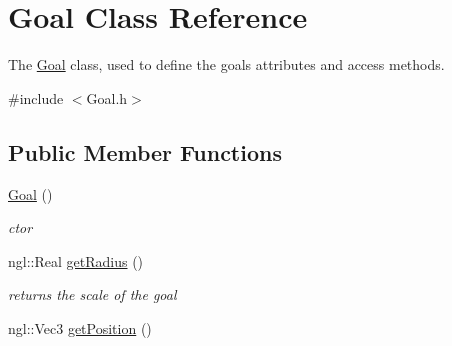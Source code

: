 \hypertarget{class_goal}{}\section{Goal Class Reference}
\label{class_goal}


The \hyperlink{class_goal}{Goal} class, used to define the goal\textquotesingle{}s attributes and access methods.  




{\ttfamily \#include $<$Goal.\+h$>$}

\subsection*{Public Member Functions}
\begin{DoxyCompactItemize}
\item 
\hypertarget{class_goal_aef5013c9bf548e51178f58da869d508a}{}\hyperlink{class_goal_aef5013c9bf548e51178f58da869d508a}{Goal} ()\label{class_goal_aef5013c9bf548e51178f58da869d508a}

\begin{DoxyCompactList}\small\item\em ctor \end{DoxyCompactList}\item 
\hypertarget{class_goal_a41b52fb4aed63337a5894f986b8c40ee}{}ngl\+::\+Real \hyperlink{class_goal_a41b52fb4aed63337a5894f986b8c40ee}{get\+Radius} ()\label{class_goal_a41b52fb4aed63337a5894f986b8c40ee}

\begin{DoxyCompactList}\small\item\em returns the scale of the goal \end{DoxyCompactList}\item 
\hypertarget{class_goal_a638ba69f64454e4020b6de63f5ed48eb}{}ngl\+::\+Vec3 \hyperlink{class_goal_a638ba69f64454e4020b6de63f5ed48eb}{get\+Position} ()\label{class_goal_a638ba69f64454e4020b6de63f5ed48eb}


\end{DoxyCompactItemize}
